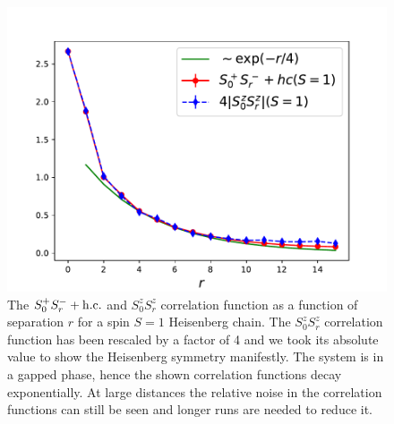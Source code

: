 \documentclass[pra,aps,showpacs,groupedaddress,superscriptaddress,twocolumn,toc=flat]{revtex4-1}
\begin{document}
\begin{figure}[h!]
\centering
\includegraphics[width=0.6\linewidth]{fig_corr_one.pdf}
\caption{The $S^+_0S^-_r + {\rm h.c.}$ and $S^z_0S^z_r$ correlation function as a function of separation $r$ for a spin $S=1$ Heisenberg chain. The $S^z_0S^z_r$ correlation function has been rescaled by a factor of 4 and we took its absolute value to show the Heisenberg symmetry manifestly. The system is in a gapped phase, hence the shown correlation functions decay exponentially. At large distances the relative noise in the correlation functions can still be seen and longer runs are needed to reduce it.
} 
\label{fig:one}
\end{figure}
\end{document}
